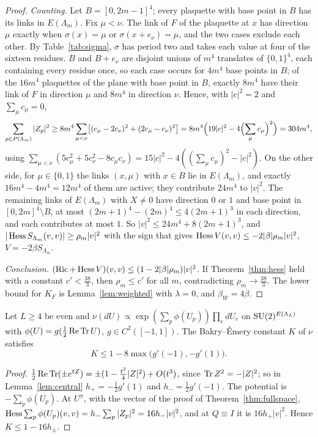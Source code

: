 \begin{proof}
\emph{Counting.} Let $B=[0,2m-1]^4$; every plaquette with base point in $B$ has
its links in $E(\Lambda_m)$. Fix $\mu<\nu$. The link of $F$ of the plaquette at
$x$ has direction $\mu$ exactly when $\sigma(x)=\mu$ or $\sigma(x+e_\nu)=\mu$,
and the two cases exclude each other. By Table~\ref{tab:sigma}, $\sigma$ has
period two and takes each value at four of the sixteen residues. $B$ and
$B+e_\nu$ are disjoint unions of $m^4$ translates of $\{0,1\}^4$, each
containing every residue once, so each case occurs for $4m^4$ base points in
$B$; of the $16m^4$ plaquettes of the plane with base point in $B$, exactly
$8m^4$ have their link of $F$ in direction $\mu$ and $8m^4$ in direction $\nu$.
Hence, with $|c|^2=2$ and $\sum_\mu c_\mu=0$,
\[
\sum_{p\in P(\Lambda_m)}|Z_p|^2\ge8m^4\sum_{\mu<\nu}\bigl[(c_\mu-2c_\nu)^2+
(2c_\mu-c_\nu)^2\bigr]=8m^4\Bigl(19|c|^2-4\Bigl(\sum_\mu c_\mu\Bigr)^2\Bigr)=
304m^4,
\]
using $\sum_{\mu<\nu}(5c_\mu^2+5c_\nu^2-8c_\mu c_\nu)=15|c|^2-4((\sum_\mu c_\mu
)^2-|c|^2)$. On the other side, for $\mu\in\{0,1\}$ the links $(x,\mu)$ with
$x\in B$ lie in $E(\Lambda_m)$, and exactly $16m^4-4m^4=12m^4$ of them are
active; they contribute $24m^4$ to $|v|^2$. The remaining links of
$E(\Lambda_m)$ with $X\ne0$ have direction $0$ or $1$ and base point in
$[0,2m]^4\setminus B$, at most $(2m+1)^4-(2m)^4\le4(2m+1)^3$ in each direction,
and each contributes at most $1$. So $|v|^2\le24m^4+8(2m+1)^3$, and
$|\operatorname{Hess} S_{\Lambda_m}(v,v)|\ge\rho_m|v|^2$ with the sign that gives $\operatorname{Hess} V(v,
v)\le-2|\beta|\rho_m|v|^2$, $V=-2\beta S_{\Lambda_m}$.

\emph{Conclusion.} $(\operatorname{Ric}+\operatorname{Hess} V)(v,v)\le(1-2|\beta|\rho_m)|v|^2$. If
Theorem~\ref{thm:hess} held with a constant $c'<\frac{38}3$, then $\rho_m\le c'$
for all $m$, contradicting $\rho_m\to\frac{38}3$. The lower bound for $K_F$ is
Lemma~\ref{lem:weighted} with $\lambda=0$, and $\beta_W=4\beta$.
\end{proof}

\begin{proposition}\label{prop:coarse}
Let $L\ge4$ be even and $\nu(dU)\propto\exp(\sum_p\phi(U_p))\prod_edU_e$ on
$\mathrm{SU}(2)^{E(\Lambda_L)}$ with $\phi(U)=g(\frac12\operatorname{Re}\operatorname{Tr} U)$, $g\in C^2([-1,1])$. The
Bakry--\'Emery constant $K$ of $\nu$ satisfies
\[
K\le1-8\max\bigl(g'(-1),-g'(1)\bigr).
\]
\end{proposition}

\begin{proof}
$\frac12\operatorname{Re}\operatorname{Tr}(\pm e^{tZ})=\pm(1-\frac{t^2}4|Z|^2)+O(t^3)$, since $\operatorname{Tr} Z^2=
-|Z|^2$; so in Lemma~\ref{lem:central} $h_+=-\frac12g'(1)$ and $h_-=\frac12
g'(-1)$. The potential is $-\sum_p\phi(U_p)$. At $U^\pi$, with the vector of
the proof of Theorem~\ref{thm:fullspace}, $\operatorname{Hess}\sum_p\phi(U_p)(v,v)=h_-\sum_p
|Z_p|^2=16h_-|v|^2$, and at $Q\equiv I$ it is $16h_+|v|^2$. Hence $K\le1-16
h_\pm$.
\end{proof}

